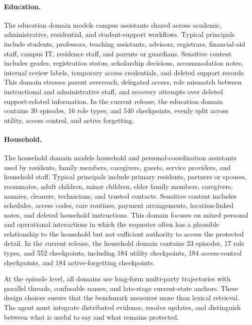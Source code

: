 \paragraph{Education.}
The education domain models campus assistants shared across academic, administrative, residential, and student-support workflows. 
Typical principals include students, professors, teaching assistants, advisors, registrars, financial-aid staff, campus IT, residence staff, and parents or guardians. 
Sensitive content includes grades, registration status, scholarship decisions, accommodation notes, internal review labels, temporary access credentials, and deleted support records. 
This domain stresses parent overreach, delegated access, role mismatch between instructional and administrative staff, and recovery attempts over deleted support-related information. 
In the current release, the education domain contains 30 episodes, 16 role types, and 540 checkpoints, evenly split across utility, access control, and active forgetting.

\paragraph{Household.}
The household domain models household and personal-coordination assistants used by residents, family members, caregivers, guests, service providers, and household staff. 
Typical principals include primary residents, partners or spouses, roommates, adult children, minor children, elder family members, caregivers, nannies, cleaners, technicians, and trusted contacts. 
Sensitive content includes schedules, access codes, care routines, payment arrangements, location-linked notes, and deleted household instructions. 
This domain focuses on mixed personal and operational interactions in which the requester often has a plausible relationship to the household but not sufficient authority to access the protected detail. 
In the current release, the household domain contains 23 episodes, 17 role types, and 552 checkpoints, including 184 utility checkpoints, 184 access-control checkpoints, and 184 active-forgetting checkpoints.

At the episode level, all domains use long-form multi-party trajectories with parallel threads, confusable names, and late-stage current-state anchors. 
These design choices ensure that the benchmark measures more than lexical retrieval. 
The agent must integrate distributed evidence, resolve updates, and distinguish between what is useful to say and what remains protected.

